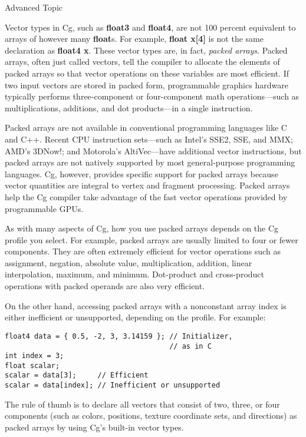 \documentclass[../main.tex]{subfiles}
\begin{document}
\begin{framed}
Advanced Topic

Vector types in Cg, such as \textbf{float3} and \textbf{float4}, are not 100 percent equivalent to arrays of however many \textbf{float}s. For example, \textbf{float x[4]} is not the same declaration as \textbf{float4 x}. These vector types are, in fact, \textit{packed arrays}. Packed arrays, often just called vectors, tell the compiler to allocate the elements of packed arrays so that vector operations on these variables are most efficient. If two input vectors are stored in packed form, programmable graphics hardware typically performs three-component or four-component math operations—such as multiplications, additions, and dot products—in a single instruction.

Packed arrays are not available in conventional programming languages like C and C++. Recent CPU instruction sets—such as Intel's SSE2, SSE, and MMX; AMD's 3DNow!; and Motorola's AltiVec—have additional vector instructions, but packed arrays are not natively supported by most general-purpose programming languages. Cg, however, provides specific support for packed arrays because vector quantities are integral to vertex and fragment processing. Packed arrays help the Cg compiler take advantage of the fast vector operations provided by programmable GPUs.

As with many aspects of Cg, how you use packed arrays depends on the Cg profile you select. For example, packed arrays are usually limited to four or fewer components. They are often extremely efficient for vector operations such as assignment, negation, absolute value, multiplication, addition, linear interpolation, maximum, and minimum. Dot-product and cross-product operations with packed operands are also very efficient.

On the other hand, accessing packed arrays with a nonconstant array index is either inefficient or unsupported, depending on the profile. For example:

\FloatBarrier
\begin{lstlisting}
float4 data = { 0.5, -2, 3, 3.14159 }; // Initializer,
                                       // as in C
int index = 3;
float scalar;
scalar = data[3];     // Efficient
scalar = data[index]; // Inefficient or unsupported
\end{lstlisting}
\FloatBarrier

The rule of thumb is to declare all vectors that consist of two, three, or four components (such as colors, positions, texture coordinate sets, and directions) as packed arrays by using Cg's built-in vector types.
\end{framed}
\end{document}
